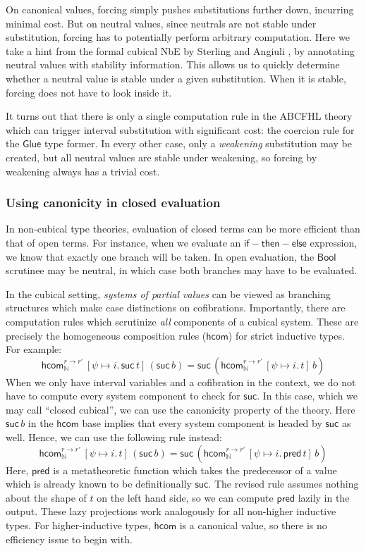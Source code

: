 \documentclass[letterpaper]{easychair}
\newcommand{\msf}[1]{\mathsf{#1}}
\newcommand{\mbb}[1]{\mathbb{#1}}
\newcommand{\suc}{\msf{suc}}
\begin{document}
On canonical values, forcing simply pushes substitutions further down, incurring
minimal cost. But on neutral values, since neutrals are not stable under
substitution, forcing has to potentially perform arbitrary computation. Here we
take a hint from the formal cubical NbE by Sterling and Angiuli
\cite{ctt-normalization}, by annotating neutral values with stability
information. This allows us to quickly determine whether a neutral value is
stable under a given substitution. When it is stable, forcing does not have to
look inside it.

It turns out that there is only a single computation rule in the ABCFHL theory
which can trigger interval substitution with significant cost: the coercion rule
for the $\msf{Glue}$ type former. In every other case, only a \emph{weakening}
substitution may be created, but all neutral values are stable under weakening,
so forcing by weakening always has a trivial cost.

\subsubsection*{Using canonicity in closed evaluation}

In non-cubical type theories, evaluation of closed terms can be more efficient
than that of open terms. For instance, when we evaluate an
$\msf{if\!-\!then\!-\!else}$ expression, we know that exactly one branch will be
taken. In open evaluation, the $\msf{Bool}$ scrutinee may be neutral, in which
case both branches may have to be evaluated.

In the cubical setting, \emph{systems of partial values} can be viewed as
branching structures which make case distinctions on cofibrations. Importantly,
there are computation rules which scrutinize \emph{all} components of a cubical
system. These are precisely the homogeneous composition rules ($\msf{hcom}$) for
strict inductive types. For example:
\[ \msf{hcom}^{r\to r'}_{\mbb{N}}\,[\psi \mapsto i.\,\suc\,t]\,(\suc\,b) =
\suc\,(\msf{hcom}^{r\to r'}_{\mbb{N}}\,[\psi \mapsto i.\,t]\,b) \]
When we only have interval variables and a cofibration in the context, we do not
have to compute every system component to check for $\suc$. In this case, which
we may call ``closed cubical'', we can use the canonicity property of the
theory. Here $\suc\,b$ in the $\msf{hcom}$ base implies that every system
component is headed by $\suc$ as well. Hence, we can use the following rule
instead:
\[ \msf{hcom}^{r\to r'}_{\mbb{N}}\,[\psi \mapsto i.\,t]\,(\suc\,b) =
   \suc\,(\msf{hcom}^{r\to r'}_{\mbb{N}}\,[\psi \mapsto i.\,\msf{pred}\,t]\,b) \]
Here, $\msf{pred}$ is a metatheoretic function which takes the predecessor of a
value which is already known to be definitionally $\suc$. The revised rule
assumes nothing about the shape of $t$ on the left hand side, so we can compute
$\msf{pred}$ lazily in the output. These lazy projections work analogously for
all non-higher inductive types. For higher-inductive types, $\msf{hcom}$ is a
canonical value, so there is no efficiency issue to begin with.
\end{document}
